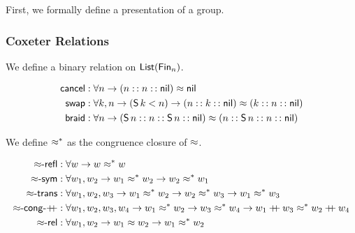 

First, we formally define a presentation of a group.



\subsubsection{Coxeter Relations}

We define a binary relation on $\List[\Fin[n]]$.

\begin{definition}[$\cox$]
  \begin{align*}
    \cancel
    & : \forall n \to (n \cons n \cons \nil) \cox \nil \\
    \swap
    & : \forall k, n \to (\suc[k] < n) \to (n \cons k \cons \nil) \cox (k \cons n \cons \nil) \\
    \braid
    & : \forall n \to (\suc[n] \cons n \cons \suc[n] \cons \nil) \cox (n \cons \suc[n] \cons n \cons \nil) \\
  \end{align*}
\end{definition}

We define $\cox*$ as the congruence closure of $\cox$.

\begin{definition}[$\cox*$]
  \begin{align*}
    \reflr{\cox}
    & : \forall w \to w \cox* w \\
    \symr{\cox}
    & : \forall w_{1}, w_{2} \to w_{1} \cox* w_{2} \to w_{2} \cox* w_{1} \\
    \transr{\cox}
    & : \forall w_{1}, w_{2}, w_{3} \to  w_{1} \cox* w_{2} \to w_{2} \cox* w_{3} \to w_{1} \cox* w_{3} \\
    \congrf{\cox}{\append}
    & : \forall w_{1}, w_{2}, w_{3}, w_{4} \to  w_{1} \cox* w_{2} \to w_{3} \cox* w_{4} \to w_{1} \append w_{3} \cox* w_{2} \append w_{4} \\
    \relr{\cox}
    & : \forall w_{1}, w_{2} \to w_{1} \cox w_{2} \to w_{1} \cox* w_{2} \\
  \end{align*}
\end{definition}

